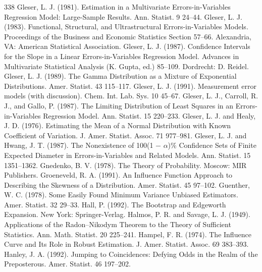 \begin{thebibliography}{338}
\label{bib:source143} Gleser, L. J. (1981). Estimation in a Multivariate Errors-in-Variables Regression Model: Large-Sample Results. Ann. Statist. 9 24–44.
\label{bib:source144} Gleser, L. J. (1983). Functional, Structural, and Ultrastructural Errors-in-Variables Models. Proceedings of the Business and Economic Statistics Section 57–66. Alexandria, VA: American Statistical Association.
\label{bib:source145} Gleser, L. J. (1987). Confidence Intervals for the Slope in a Linear Errors-in-Variables Regression Model. Advances in Multivariate Statistical Analysis (K. Gupta, ed.) 85–109. Dordrecht: D. Reidel.
\label{bib:source146} Gleser, L. J. (1989). The Gamma Distribution as a Mixture of Exponential Distributions. Amer. Statist. 43 115–117.
\label{bib:source147} Gleser, L. J. (1991). Measurement error models (with discussion). Chem. Int. Lab. Sys. 10 45–67.
\label{bib:source148} Gleser, L. J., Carroll, R. J., and Gallo, P. (1987). The Limiting Distribution of Least Squares in an Errors-in-Variables Regression Model. Ann. Statist. 15 220–233.
\label{bib:source149} Gleser, L. J. and Healy, J. D. (1976). Estimating the Mean of a Normal Distribution with Known Coefficient of Variation. J. Amer. Statist. Assoc. 71 977–981.
\label{bib:source150} Gleser, L. J. and Hwang, J. T. (1987). The Nonexistence of 100(1 − \ensuremath{\alpha})\% Confidence Sets of Finite Expected Diameter in Errors-in-Variables and Related Models. Ann. Statist. 15 1351–1362.
\label{bib:source151} Gnedenko, B. V. (1978). The Theory of Probability. Moscow: MIR Publishers.
\label{bib:source152} Groeneveld, R. A. (1991). An Influence Function Approach to Describing the Skewness of a Distribution. Amer. Statist. 45 97–102.
\label{bib:source153} Guenther, W. C. (1978). Some Easily Found Minimum Variance Unbiased Estimators. Amer. Statist. 32 29–33.
\label{bib:source154} Hall, P. (1992). The Bootstrap and Edgeworth Expansion. New York: Springer-Verlag.
\label{bib:source155} Halmos, P. R. and Savage, L. J. (1949). Applications of the Radon–Nikodym Theorem to the Theory of Sufficient Statistics. Ann. Math. Statist. 20 225–241.
\label{bib:source156} Hampel, F. R. (1974). The Influence Curve and Its Role in Robust Estimation. J. Amer. Statist. Assoc. 69 383–393.
\label{bib:source157} Hanley, J. A. (1992). Jumping to Coincidences: Defying Odds in the Realm of the Preposterous. Amer. Statist. 46 197–202.

\end{thebibliography}
